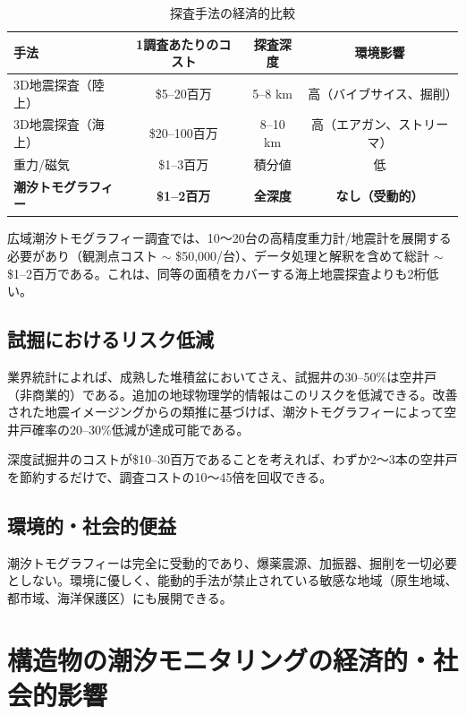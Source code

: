 \documentclass[12pt,a4paper]{article}
\theoremstyle{remark}
\begin{document}
	\begin{table}[htbp]
		\centering
		\caption{探査手法の経済的比較}
		\label{tab:economics}
		\small
		\begin{tabular}{lccc}
			\toprule
			\textbf{手法} & \textbf{1調査あたりのコスト} & \textbf{探査深度} & \textbf{環境影響} \\
			\midrule
			3D地震探査（陸上） & \$5–20百万 & 5–8 km & 高（バイブサイス、掘削） \\
			3D地震探査（海上） & \$20–100百万 & 8–10 km & 高（エアガン、ストリーマ） \\
			重力/磁気 & \$1–3百万 & 積分値 & 低 \\
			\textbf{潮汐トモグラフィー} & \textbf{\$1–2百万} & \textbf{全深度} & \textbf{なし（受動的）} \\
			\bottomrule
		\end{tabular}
	\end{table}
	
	広域潮汐トモグラフィー調査では、10～20台の高精度重力計/地震計を展開する必要があり（観測点コスト \(\sim\) \$50,000/台）、データ処理と解釈を含めて総計 \(\sim\) \$1–2百万である。これは、同等の面積をカバーする海上地震探査よりも2桁低い。
	
	\subsection{試掘におけるリスク低減}
	
	業界統計によれば、成熟した堆積盆においてさえ、試掘井の30–50\%は空井戸（非商業的）である。追加の地球物理学的情報はこのリスクを低減できる。改善された地震イメージングからの類推に基づけば、潮汐トモグラフィーによって空井戸確率の20–30\%低減が達成可能である。
	
	深度試掘井のコストが\$10–30百万であることを考えれば、わずか2～3本の空井戸を節約するだけで、調査コストの10～45倍を回収できる。
	
	\subsection{環境的・社会的便益}
	
	潮汐トモグラフィーは完全に受動的であり、爆薬震源、加振器、掘削を一切必要としない。環境に優しく、能動的手法が禁止されている敏感な地域（原生地域、都市域、海洋保護区）にも展開できる。
	
	\section{構造物の潮汐モニタリングの経済的・社会的影響}
	\label{sec:structural-economics}
	
\end{document}
